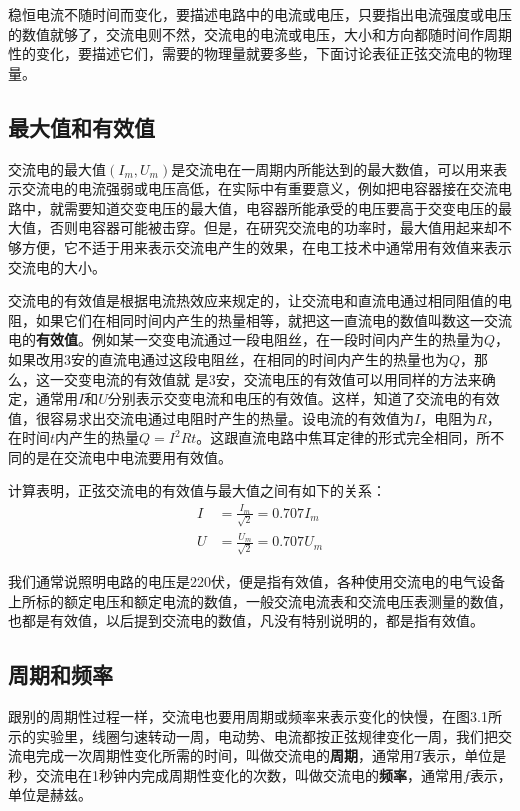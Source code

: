 稳恒电流不随时间而变化，要描述电路中的电流或电压，只要指出电流强度或电压的数值就够了，交流电则不然，交流电的电流或电压，大小和方向都随时间作周期性的变化，要描述它们，需要的物理量就要多些，下面讨论表征正弦交流电的物理量。

\subsection{最大值和有效值}

交流电的最大值$(I_m,U_m)$是交流电在一周期内所能达到的最大数值，可以用来表示交流电的电流强弱或电压高低，在实际中有重要意义，例如把电容器接在交流电路中，就需要知道交变电压的最大值，电容器所能承受的电压要高于交变电压的最大值，否则电容器可能被击穿。但是，在研究交流电的功率时，最大值用起来却不够方便，它不适于用来表示交流电产生的效果，在电工技术中通常用有效值来表示交流电的大小。

交流电的有效值是根据电流热效应来规定的，让交流电和直流电通过相同阻值的电阻，如果它们在相同时间内产生的热量相等，就把这一直流电的数值叫数这一交流电的\textbf{有效值}。例如某一交变电流通过一段电阻丝，在一段时间内产生的热量为$Q$，如果改用3安的直流电通过这段电阻丝，在相同的时间内产生的热量也为$Q$，那么，这一交变电流的有效值就
是3安，交流电压的有效值可以用同样的方法来确定，通常用$I$和$U$分别表示交变电流和电压的有效值。这样，知道了交流电的有效值，很容易求出交流电通过电阻时产生的热量。设电流的有效值为$I$，电阻为$R$，在时间$t$内产生的热量$Q=I^2Rt$。这跟直流电路中焦耳定律的形式完全相同，所不同的是在交流电中电流要用有效值。

计算表明，正弦交流电的有效值与最大值之间有如下的关系：
\[\begin{split}
   I&=\frac{I_m}{\sqrt{2}}=0.707I_m\\
   U&=\frac{U_m}{\sqrt{2}}=0.707U_m 
\end{split}\]

我们通常说照明电路的电压是220伏，便是指有效值，各种使用交流电的电气设备上所标的额定电压和额定电流的数值，一般交流电流表和交流电压表测量的数值，也都是有效值，以后提到交流电的数值，凡没有特别说明的，都是指有效值。

\subsection{周期和频率}

跟别的周期性过程一样，交流电也要用周期或频率来表示变化的快慢，在图3.1所示的实验里，线圈匀速转动一周，电动势、电流都按正弦规律变化一周，我们把交流电完成一次周期性变化所需的时间，叫做交流电的\textbf{周期}，通常用$T$表示，单位是秒，交流电在1秒钟内完成周期性变化的次数，叫做交流电的\textbf{频率}，通常用$f$表示，单位是赫兹。

